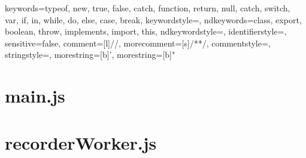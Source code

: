 
{
  keywords={typeof, new, true, false, catch, function, return, null, catch, switch, var, if, in, while, do, else, case, break},
  keywordstyle=\color{blue}\ttfamily,
  ndkeywords={class, export, boolean, throw, implements, import, this},
  ndkeywordstyle=\color{darkgray}\ttfamily,
  identifierstyle=\color{black},
  sensitive=false,
  comment=[l]{//},
  morecomment=[s]{/*}{*/},
  commentstyle=\color{purple}\ttfamily,
  stringstyle=\color{red}\ttfamily,
  morestring=[b]',
  morestring=[b]"
}

	\section{main.js}
	
	
	
	
	\section{recorderWorker.js}
	